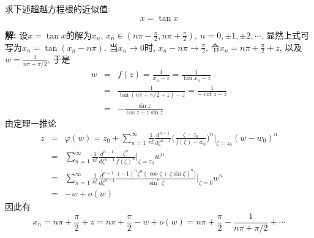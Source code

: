 \begin{problem}[习题1.9]
求下述超越方程根的近似值:
\[
x = \tan x
\]
\end{problem}

\begin{solution}
\textbf{解:} 设$x=\tan x$的解为$x_n$, $x_n\in (n\pi-\frac{\pi}{2}, n\pi +\frac{\pi}{2}), ~n=0,\pm 1,\pm 2,\cdots$. 显然上式可写为$x_n = \tan(x_n-n\pi)$. 当$x_n\rightarrow 0$时, $x_n-n\pi\rightarrow \frac{\pi}{2}$, 令$x_n=n\pi+\frac{\pi}{2} + z$, 以及$w=\frac{1}{n\pi+\pi/2}$, 于是
\begin{eqnarray}
w &=& f(z) = \frac{1}{x_n-z} = \frac{1}{\tan x_n - z} \nonumber\\
&=& \frac{1}{\tan (n\pi+\pi/2+z) - z} = \frac{1}{-\cot z - z}\nonumber\\
&=& -\frac{\sin z}{\cos z + z\sin z}\nonumber
\end{eqnarray}
由定理一推论
\begin{eqnarray}
z&=&\varphi(w) = z_0 + \sum_{n=1}^{\infty}\frac{1}{n!}\frac{d^{n-1}}{d\zeta^{n-1}}
\Big(\frac{\zeta-z_0}{f(\zeta)-w_0}\Big)^n\Big|_{\zeta=z_0}(w-w_0)^n\nonumber\\
&=& \sum_{n=1}^{\infty}\frac{1}{n!}\frac{d^{n-1}}{d\zeta^{n-1}}
\frac{\zeta^n}{f(\zeta)^n}\Big|_{\zeta=z_0}w^n\nonumber\\
&=&\sum_{n=1}^{\infty}\frac{1}{n!}\frac{d^{n-1}}{d\zeta^{n-1}}
\frac{(-1)^n\zeta^n(\cos\zeta+\zeta\sin\zeta)^n)}{\sin^n\zeta}\Big|_{\zeta=0}w^n\nonumber\\
&=& - w + o(w)\nonumber
\end{eqnarray}
因此有
\[
x_n=n\pi+\frac{\pi}{2} + z = n\pi+\frac{\pi}{2}- w + o(w) = n\pi+\frac{\pi}{2} - \frac{1}{n\pi+\pi/2} + \cdots
\]
\end{solution} 
